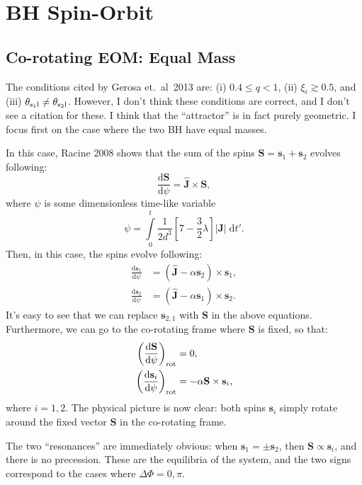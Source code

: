 \documentclass[11pt,
        usenames, %
        dvipsnames %
    ]{article}
\newcommand*{\rd}[2]{\frac{\mathrm{d}#1}{\mathrm{d}#2}}
\newcommand*{\bm}[1]{\boldsymbol{\mathbf{#1}}}
\newcommand*{\uv}[1]{\hat{\bm{#1}}}
\newcommand*{\abs}[1]{\left|#1\right|}
\newcommand*{\p}[1]{\left(#1\right)}
\newcommand*{\s}[1]{\left[#1\right]}
\begin{document}
\section{BH Spin-Orbit}

\subsection{Co-rotating EOM\@: Equal Mass}

The conditions cited by Gerosa et.\ al\ 2013 are: (i) $0.4 \leq q < 1$, (ii)
$\xi_i \gtrsim 0.5$, and (iii) $\theta_{\rm s_1l} \neq \theta_{\rm s_2l}$.
However, I don't think these conditions are correct, and I don't see a citation
for these. I think that the ``attractor'' is in fact purely geometric. I focus
first on the case where the two BH have equal masses.

In this case, Racine 2008 shows that the sum of the spins $\bm{S} = \bm{s}_1 +
\bm{s}_2$ evolves following:
\begin{equation}
    \rd{\bm{S}}{\psi} = \uv{J} \times \bm{S},
\end{equation}
where $\psi$ is some dimensionless time-like variable
\begin{equation}
    \psi = \int\limits_0^t
        \frac{1}{2d^3}
            \s{7 - \frac{3}{2}\lambda}\abs{\bm{J}}\;\mathrm{d}t'.
\end{equation}
Then, in this case, the spins evolve following:
\begin{align}
    \rd{\bm{s}_1}{\psi} &= \p{\uv{J} - \alpha \bm{s}_2} \times \bm{s}_1,\\
    \rd{\bm{s}_2}{\psi} &= \p{\uv{J} - \alpha \bm{s}_1} \times \bm{s}_2.
\end{align}
It's easy to see that we can replace $\bm{s}_{2, 1}$ with $\bm{S}$ in the above
equations. Furthermore, we can go to the co-rotating frame where $\bm{S}$ is
fixed, so that:
\begin{align}
    \p{\rd{\bm{S}}{\psi}}_{\rm rot} &= 0,\\
    \p{\rd{\bm{s}_i}{\psi}}_{\rm rot} &= -\alpha \bm{S} \times \bm{s}_i,
\end{align}
where $i = 1, 2$. The physical picture is now clear: both spins $\bm{s}_i$
simply rotate around the fixed vector $\bm{S}$ in the co-rotating frame.

The two ``resonances'' are immediately obvious: when $\bm{s}_1 = \pm \bm{s}_2$,
then $\bm{S} \propto \bm{s}_i$, and there is no precession. These are the
equilibria of the system, and the two signs correspond to the cases where
$\Delta \Phi = 0, \pi$.
\end{document}
